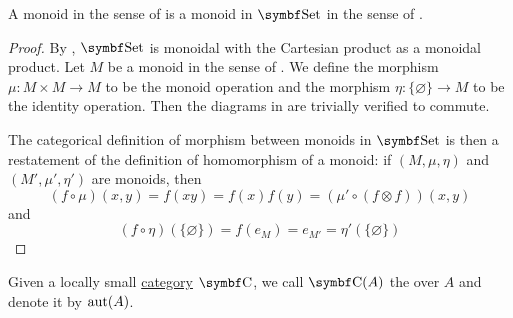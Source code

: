 \begin{Proposition}\label{thm:monoids_are_monoids_in_set}
  A monoid in the sense of  is a monoid in \( \Cat{Set} \) in the sense of .
\end{Proposition}
\begin{proof}
  By , \( \Cat{Set} \) is monoidal with the Cartesian product as a monoidal product. Let \( M \) be a monoid in the sense of . We define the morphism \( \mu: M \times M \to M \) to be the monoid operation and the morphism \( \eta: \{ \varnothing \} \to M \) to be the identity operation. Then the diagrams in  are trivially verified to commute.

  The categorical definition of morphism between monoids in \( \Cat{Set} \) is then a restatement of the definition of homomorphism of a monoid: if \( (M, \mu, \eta) \) and \( (M', \mu', \eta') \) are monoids, then
  \begin{equation*}
    (f \circ \mu)(x, y)
    =
    f(xy)
    =
    f(x) f(y)
    =
    (\mu' \circ (f \otimes f))(x, y)
  \end{equation*}
  and
  \begin{equation*}
    (f \circ \eta)(\{ \varnothing \})
    =
    f(e_M)
    =
    e_{M'}
    =
    \eta'(\{ \varnothing \})
  \end{equation*}
\end{proof}

\begin{Definition}\label{def:automorphism_group}
  Given a locally small \hyperref[def:category]{category} \( \Cat{C} \), we call \( \Cat{C}(A) \) the  over \( A \) and denote it by \( \operatorname{aut}(A) \).
\end{Definition}

